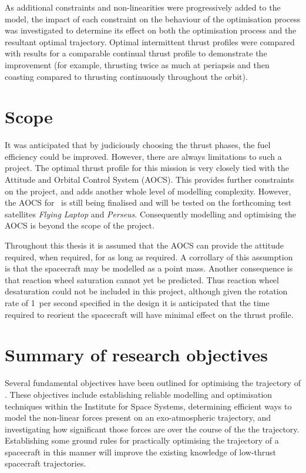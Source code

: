 As additional constraints and non-linearities were progressively added to the model, the impact of each constraint on the behaviour of the optimisation process was investigated to determine its effect on both the optimisation process and the resultant optimal trajectory. Optimal intermittent thrust profiles were compared with results for a comparable continual thrust profile to demonstrate the improvement (for example, thrusting twice as much at periapsis and then coasting compared to thrusting continuously throughout the orbit). 

\section{Scope}

It was anticipated that by judiciously choosing the thrust phases, the fuel efficiency could be improved. However, there are always limitations to such a project. The optimal thrust profile for this mission is very closely tied with the Attitude and Orbital Control System (AOCS). This provides further constraints on the project, and adds another whole level of modelling complexity. However, the AOCS for \BW\ is still being finalised and will be tested on the forthcoming test satellites \emph{Flying Laptop} and \emph{Perseus}. Consequently modelling and optimising the AOCS is beyond the scope of the project. 

Throughout this thesis it is assumed that the AOCS can provide the attitude required, when required, for as long as required. A corrollary of this assumption is that the spacecraft may be modelled as a point mass. Another consequence is that reaction wheel saturation cannot yet be predicted. Thus reaction wheel desaturation could not be included in this project, although given the rotation rate of 1\degrees\ per second specified in the design it is anticipated that the time required to reorient the spacecraft will have minimal effect on the thrust profile.

\section{Summary of research objectives} \label{sec:Objective-summary}

Several fundamental objectives have been outlined for optimising the trajectory of \BW. These objectives include establishing reliable modelling and optimisation techniques within the Institute for Space Systems, determining efficient ways to model the non-linear forces present on an exo-atmospheric trajectory, and investigating how significant those forces are over the course of the the trajectory. Establishing some ground rules for practically optimising the trajectory of a spacecraft in this manner will improve the existing knowledge of low-thrust spacecraft trajectories.